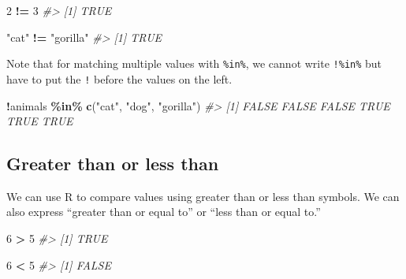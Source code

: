 \documentclass[
  12pt,
]{book}
\newenvironment{Shaded}{\begin{snugshade}}{\end{snugshade}}
\newcommand{\CommentTok}[1]{\textcolor[rgb]{0.37,0.37,0.37}{\textit{#1}}}
\newcommand{\DecValTok}[1]{\textcolor[rgb]{0.06,0.06,0.06}{#1}}
\newcommand{\KeywordTok}[1]{\textcolor[rgb]{0.27,0.27,0.27}{\textbf{#1}}}
\newcommand{\NormalTok}[1]{#1}
\newcommand{\OperatorTok}[1]{\textcolor[rgb]{0.43,0.43,0.43}{\textbf{#1}}}
\newcommand{\StringTok}[1]{\textcolor[rgb]{0.5,0.5,0.5}{#1}}
\begin{document}
\begin{Shaded}
\begin{Highlighting}[]
\DecValTok{2} \OperatorTok{!=}\StringTok{ }\DecValTok{3}
\CommentTok{\#> [1] TRUE}
\end{Highlighting}
\end{Shaded}

\begin{Shaded}
\begin{Highlighting}[]
\StringTok{"cat"} \OperatorTok{!=}\StringTok{ "gorilla"}
\CommentTok{\#> [1] TRUE}
\end{Highlighting}
\end{Shaded}

Note that for matching multiple values with \texttt{\%in\%}, we cannot write \texttt{!\%in\%} but have to put the \texttt{!} before the values on the left.

\begin{Shaded}
\begin{Highlighting}[]
\OperatorTok{!}\NormalTok{animals }\OperatorTok{\%in\%}\StringTok{ }\KeywordTok{c}\NormalTok{(}\StringTok{"cat"}\NormalTok{, }\StringTok{"dog"}\NormalTok{, }\StringTok{"gorilla"}\NormalTok{)}
\CommentTok{\#> [1] FALSE FALSE FALSE  TRUE  TRUE  TRUE}
\end{Highlighting}
\end{Shaded}

\hypertarget{greater-than-or-less-than}{%
\subsection{Greater than or less than}\label{greater-than-or-less-than}}

We can use R to compare values using greater than or less than symbols. We can also express ``greater than or equal to'' or ``less than or equal to.''

\begin{Shaded}
\begin{Highlighting}[]
\DecValTok{6} \OperatorTok{>}\StringTok{ }\DecValTok{5}
\CommentTok{\#> [1] TRUE}
\end{Highlighting}
\end{Shaded}

\begin{Shaded}
\begin{Highlighting}[]
\DecValTok{6} \OperatorTok{<}\StringTok{ }\DecValTok{5}
\CommentTok{\#> [1] FALSE}
\end{Highlighting}
\end{Shaded}
\end{document}
